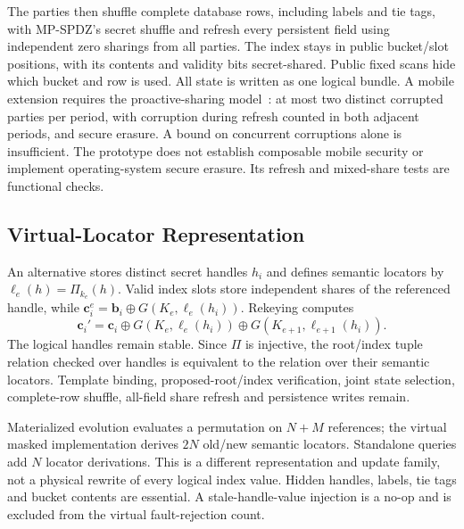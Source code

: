 \documentclass[journal]{IEEEtran}
\begin{document}
The parties then shuffle complete database rows, including labels and tie tags, with MP-SPDZ's secret shuffle and refresh every persistent field using independent zero sharings from all parties. The index stays in public bucket/slot positions, with its contents and validity bits secret-shared. Public fixed scans hide which bucket and row is used. All state is written as one logical bundle. A mobile extension requires the proactive-sharing model~\cite{herzberg1995proactive}: at most two distinct corrupted parties per period, with corruption during refresh counted in both adjacent periods, and secure erasure. A bound on concurrent corruptions alone is insufficient. The prototype does not establish composable mobile security or implement operating-system secure erasure. Its refresh and mixed-share tests are functional checks.

\subsection{Virtual-Locator Representation}\label{sec:virtual}
An alternative stores distinct secret handles $h_i$ and defines semantic locators by $\ell_e(h)=\Pi_{k_e}(h)$. Valid index slots store independent shares of the referenced handle, while $\mathbf c_i^e=\mathbf b_i\oplus G(K_e,\ell_e(h_i))$. Rekeying computes
\[
\mathbf c_i'=\mathbf c_i\oplus G(K_e,\ell_e(h_i))\oplus G(K_{e+1},\ell_{e+1}(h_i)).
\]
The logical handles remain stable. Since $\Pi$ is injective, the root/index tuple relation checked over handles is equivalent to the relation over their semantic locators. Template binding, proposed-root/index verification, joint state selection, complete-row shuffle, all-field share refresh and persistence writes remain.

Materialized evolution evaluates a permutation on $N+M$ references; the virtual masked implementation derives $2N$ old/new semantic locators. Standalone queries add $N$ locator derivations. This is a different representation and update family, not a physical rewrite of every logical index value. Hidden handles, labels, tie tags and bucket contents are essential. A stale-handle-value injection is a no-op and is excluded from the virtual fault-rejection count.
\end{document}
